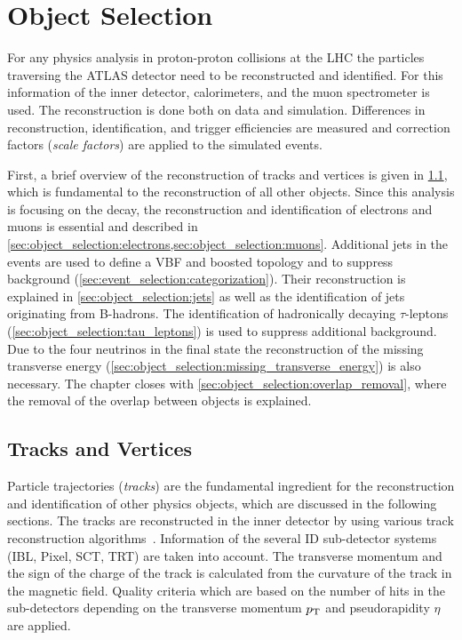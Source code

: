 \chapter{Object Selection}\label{cha:object_selection}

For any physics analysis in proton-proton collisions at the LHC the particles traversing the ATLAS detector
need to be reconstructed and identified.
For this information of the inner detector, calorimeters, and the muon spectrometer is used.
The reconstruction is done both on data and simulation. Differences in reconstruction, identification, and trigger efficiencies are
measured and correction factors (\emph{scale factors}) are applied to the simulated events.

First, a brief overview of the reconstruction of tracks and vertices is given in \cref{sec:object_selection:tracks_and_vertices}, which
is fundamental to the reconstruction of all other objects.
Since this analysis is focusing on the \Httllfull{} decay, the reconstruction and identification of electrons and muons
is essential and described in \cref{sec:object_selection:electrons,sec:object_selection:muons}.
Additional jets in the events are used to define a VBF and boosted topology and to suppress background (\cref{sec:event_selection:categorization}).
Their reconstruction is explained in \cref{sec:object_selection:jets} as well as the identification of jets originating from B-hadrons.
The identification of hadronically decaying $\tau$-leptons (\cref{sec:object_selection:tau_leptons}) is used to suppress additional background.
Due to the four neutrinos in the final state the reconstruction of the missing transverse energy (\cref{sec:object_selection:missing_transverse_energy})
is also necessary.
The chapter closes with \cref{sec:object_selection:overlap_removal}, where the removal of the overlap between objects is explained.

\section{Tracks and Vertices}\label{sec:object_selection:tracks_and_vertices}

Particle trajectories (\emph{tracks}) are the fundamental ingredient for the reconstruction and identification
of other physics objects, which are discussed in the following sections.
The tracks are reconstructed in the inner detector by using various track reconstruction algorithms~\cite{ATL-SOFT-PUB-2007-007}.
Information of the several ID sub-detector systems (IBL, Pixel, SCT, TRT) are taken into account.
The transverse momentum and the sign of the charge of the track is calculated from the curvature of the track in the magnetic field.
Quality criteria which are based on the number of hits in the sub-detectors depending on the transverse momentum $p_\text{T}$ and pseudorapidity $\eta$
are applied.

